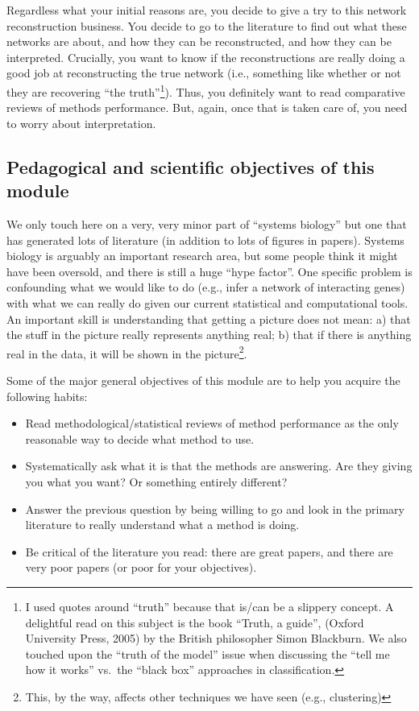 Regardless what your initial reasons are, you decide to give a try to this
network reconstruction business.  You decide to go to the literature to
find out what these networks are about, and how they can be reconstructed,
and how they can be interpreted. Crucially, you want to know if the
reconstructions are really doing a good job at reconstructing the true
network (i.e., something like whether or not they are recovering ``the
truth''\footnote{I used quotes around ``truth'' because that is/can be a
  slippery concept. A delightful read on this subject is the book ``Truth,
  a guide'', (Oxford University Press, 2005) by the British philosopher
  Simon Blackburn. We also touched upon the ``truth of the model'' issue
  when discussing the ``tell me how it works'' vs.\ the ``black box''
  approaches in classification.}). Thus, you definitely want to read
comparative reviews of methods performance. But, again, once that is taken
care of, you need to worry about interpretation.



\subsection{Pedagogical and scientific objectives of this module}

We only touch here on a very, very minor part of ``systems biology'' but
one that has generated lots of literature (in addition to lots of figures
in papers).  Systems biology is arguably an important research area, but
some people think it might have been oversold, and there is still a huge
``hype factor''.  One specific problem is confounding what we would like
to do (e.g., infer a network of interacting genes) with what we can really
do given our current statistical and computational tools. An important
skill is understanding that getting a picture does not mean: a) that the
stuff in the picture really represents anything real; b) that if there is
anything real in the data, it will be shown in the picture\footnote{This, by the way,
affects other techniques we have seen (e.g., clustering)}.




Some of the major general objectives of this module are to help you
acquire the following habits:

\begin{itemize}
\item Read methodological/statistical reviews of method performance as the
  only reasonable way to decide what  method to use.

\item Systematically ask what it is that the methods are answering. Are
  they giving you what you want? Or something entirely different?

\item Answer the previous question by being willing to go and look in the
  primary literature to really understand what a method is doing.

\item Be critical of the literature you read: there are great papers, and
  there are very poor papers (or poor for your objectives).

\end{itemize}


